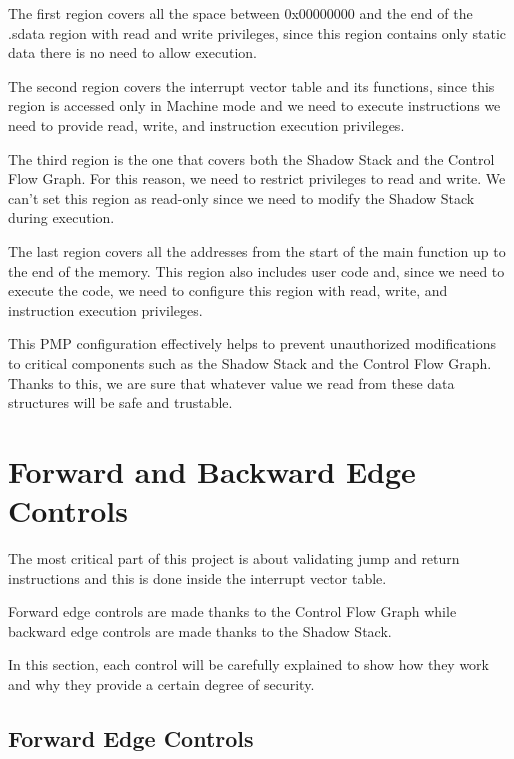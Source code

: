 The first region covers all the space between 0x00000000 and the end of the .sdata
region with read and write privileges, since this region contains only static data
there is no need to allow execution.

The second region covers the interrupt vector table and its functions, since
this region is accessed only in Machine mode and we need to execute instructions
we need to provide read, write, and instruction execution privileges.

The third region is the one that covers both the Shadow Stack and the Control
Flow Graph. For this reason, we need to restrict privileges to read and write. We
can't set this region as read-only since we need to modify the Shadow Stack during
execution.

The last region covers all the addresses from the start of the main function up to
the end of the memory. This region also includes user code and, since we need to
execute the code, we need to configure this region with read, write, and
instruction execution privileges.

This PMP configuration effectively helps to prevent unauthorized modifications
to critical components such as the Shadow Stack and the Control Flow Graph. Thanks
to this, we are sure that whatever value we read from these data structures will
be safe and trustable.

\section{Forward and Backward Edge Controls}
\label{sec:project_controls}

The most critical part of this project is about validating jump and return instructions
and this is done inside the interrupt vector table.

Forward edge controls are made thanks to the Control Flow Graph while backward edge
controls are made thanks to the Shadow Stack.

In this section, each control will be carefully explained to show how they work
and why they provide a certain degree of security.

\subsection{Forward Edge Controls}
\label{subsec:forward}

